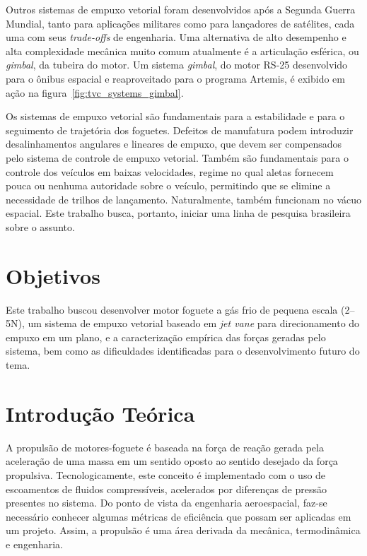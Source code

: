 Outros sistemas de empuxo vetorial foram desenvolvidos após a Segunda Guerra Mundial, tanto para aplicações militares como para lançadores de satélites, cada uma com seus \textit{trade-offs} de engenharia. Uma alternativa de alto desempenho e alta complexidade mecânica muito comum atualmente é a articulação esférica, ou \textit{gimbal}, da tubeira do motor. Um sistema \textit{gimbal}, do motor RS-25 desenvolvido para o ônibus espacial e reaproveitado para o programa Artemis, é exibido em ação na figura~\ref{fig:tvc_systems_gimbal}.

Os sistemas de empuxo vetorial são fundamentais para a estabilidade e para o seguimento de trajetória dos foguetes. Defeitos de manufatura podem introduzir desalinhamentos angulares e lineares de empuxo, que devem ser compensados pelo sistema de controle de empuxo vetorial. Também são fundamentais para o controle dos veículos em baixas velocidades, regime no qual aletas fornecem pouca ou nenhuma autoridade sobre o veículo, permitindo que se elimine a necessidade de trilhos de lançamento. Naturalmente, também funcionam no vácuo espacial. Este trabalho busca, portanto, iniciar uma linha de pesquisa brasileira sobre o assunto.

\section{Objetivos}

Este trabalho buscou desenvolver motor foguete a gás frio de pequena escala (2--5N), um sistema de empuxo vetorial baseado em \textit{jet vane} para direcionamento do empuxo em um plano, e a caracterização empírica das forças geradas pelo sistema, bem como as dificuldades identificadas para o desenvolvimento futuro do tema.

\section{Introdução Teórica}

A propulsão de motores-foguete é baseada na força de reação gerada pela aceleração de uma massa em um sentido oposto ao sentido desejado da força propulsiva. Tecnologicamente, este conceito é implementado com o uso de escoamentos de fluidos compressíveis, acelerados por diferenças de pressão presentes no sistema. Do ponto de vista da engenharia aeroespacial, faz-se necessário conhecer algumas métricas de eficiência que possam ser aplicadas em um projeto. Assim, a propulsão é uma área derivada da mecânica, termodinâmica e engenharia.

